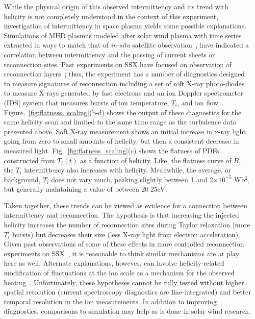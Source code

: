 \documentclass[aps,prl,amsmath,amssymb,reprint,superscriptaddress]{revtex4-1} %
\begin{document}
While the physical origin of this observed intermittency and its trend with helicity is not completely understood in the context of this experiment, investigation of intermittency in space plasma yields some possible explanations. Simulations of MHD plasmas modeled after solar wind plasma with time series extracted in ways to match that of \textit{in-situ} satellite observation~\cite{Greco08,Greco09}, have indicated a correlation between intermittency and the passing of current sheets or reconnection sites. Past experiments on SSX have focused on observation of reconnection layers~\cite{Gray10,brown12}; thus, the experiment has a number of diagnostics designed to measure signatures of reconnection including a set of soft X-ray photo-diodes~\cite{chaplin09} to measure X-rays generated by fast electrons and an ion Doppler spectrometer (IDS) system that measures bursts of ion temperature, $T_{i}$, and ion flow~\cite{brown12}. Figure.~\ref{fig:flatness_scaling}(b-d) shows the output of these diagnostics for the same helicity scan and limited to the same time range as the turbulence data presented above. Soft X-ray measurement shows an initial increase in x-ray light going from zero to small amounts of helicity, but then a consistent decrease in measured light. Fig.~\ref{fig:flatness_scaling}(c) shows the flatness of PDFs constructed from $T_{i}(t)$ as a function of helicity. Like, the flatness curve of $\dot{B}$, the $T_{i}$ intermittency also increases with helicity. Meanwhile, the average, or background, $T_{i}$ does not vary much, peaking slightly between 1 and 2$\times 10^{-5}$ Wb$^{2}$, but generally maintaining a value of between 20-25eV. 

Taken together, these trends can be viewed as evidence for a connection between intermittency and reconnection. The hypothesis is that increasing the injected helicity increases the number of reconnection sites during Taylor relaxation (more $T_{i}$ bursts) but decreases their size (less X-ray light from electron acceleration). Given past observations of some of these effects in more controlled reconnection experiments on SSX~\cite{brown12}, it is reasonable to think similar mechanisms are at play here as well. Alternate explanations, however, can involve helicity-related modification of fluctuations at the ion scale as a mechanism for the observed heating~\cite{wu13,osman11}. Unfortunately, these hypotheses cannot be fully tested without higher spatial resolution (current spectroscopy diagnostics are line-integrated) and better temporal resolution in the ion measurements. In addition to improving diagnostics, comparisons to simulation may help as is done in solar wind research.
\end{document}
